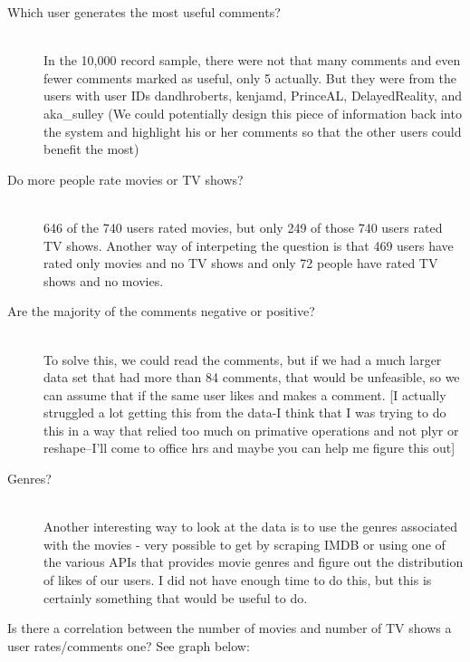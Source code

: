 \documentclass{article}
\begin{document}
\begin{description}
  \item [Which user generates the most useful comments?] \hfill \\
  In the 10,000 record sample, there were not that many comments and even fewer comments marked as useful, only 5 actually.  But they were from the users with user IDs dandhroberts, kenjamd, PrinceAL, DelayedReality, and aka\_sulley (We could potentially design this piece of information back into the system and highlight his or her comments so that the other users could benefit the most)
  \item [Do more people rate movies or TV shows?] \hfill \\
  646 of the 740 users rated movies, but only 249 of those 740 users rated TV shows.  Another way of interpeting the question is that 469 users have rated only movies and no TV shows and only 72 people have rated TV shows and no movies.
  \item [Are the majority of the comments negative or positive?] \hfill \\
  To solve this, we could read the comments, but if we had a much larger data set that had more than 84 comments, that would be unfeasible, so we can assume that if the same user likes and makes a comment. [I actually struggled a lot getting this from the data-I think that I was trying to do this in a way that relied too much on primative operations and not plyr or reshape--I'll come to office hrs and maybe you can help me figure this out]
  \item [Genres?] \hfill \\
  Another interesting way to look at the data is to use the genres associated with the movies - very possible to get by scraping IMDB or using one of the various APIs that provides movie genres and figure out the distribution of likes of our users.  I did not have enough time to do this, but this is certainly something that would be useful to do.
  \item [Is there a correlation between the number of movies and number of TV shows a user rates/comments one? See graph below:]
\end{description}
\end{document}
